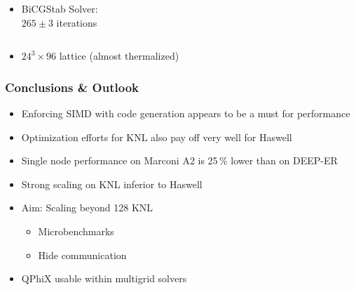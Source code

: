 \documentclass{beamer}
\begin{document}
\begin{frame}
\begin{columns}
\begin{column}{0.5\linewidth}
\begin{itemize}
            \vspace{1.5ex}

          \item BiCGStab Solver: \\ $265 \pm 3$ iterations
        \end{itemize}
      \end{column}
    \end{columns}


    \begin{small}
      \begin{itemize}
        \item $24^3 \times 96$ lattice (almost thermalized)
      \end{itemize}
    \end{small}


  \end{frame}


  \begin{frame}
    \frametitle{Conclusions \& Outlook}

    \begin{itemize}
        \item Enforcing SIMD with code generation appears to be a must for
          performance
        \item Optimization efforts for KNL also pay off very well for Haswell
    \end{itemize}

    \vfill

    \begin{itemize}
      \item Single node performance on Marconi A2 is 25\,\% lower than on DEEP-ER
      \item Strong scaling on KNL inferior to Haswell
    \end{itemize}

    \vfill

    \begin{itemize}
      \item Aim: Scaling beyond 128 KNL
        \begin{itemize}
            \item Microbenchmarks
            \item Hide communication
        \end{itemize}
      \item QPhiX usable within multigrid solvers
    \end{itemize}
  \end{frame}


  \begin{frame}
    \titlepage
  \end{frame}

  
\end{document}
